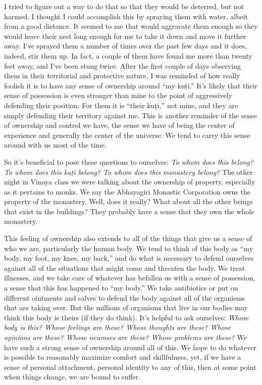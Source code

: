 I tried to figure out a way to do that so that they would be deterred, 
but not harmed. I thought I could accomplish this by spraying them with 
water, albeit from a good distance. It seemed to me that would 
aggravate them enough so they would leave their nest long enough for me 
to take it down and move it further away. I've sprayed them a number of 
times over the past few days and it does, indeed, stir them up. In 
fact, a couple of them have found me more than twenty feet away, and 
I've been stung twice. After the first couple of days observing them in 
their territorial and protective nature, I was reminded of how really 
foolish it is to have any sense of ownership around ``my kuṭi.'' It's 
likely that their sense of possession is even stronger than mine to the 
point of aggressively defending their position. For them it is ``their 
kuṭi,'' not mine, and they are simply defending their territory 
against me. This is another reminder of the sense of ownership and 
control we have, the sense we have of being the center of experience 
and generally the center of the universe. We tend to carry this sense 
around with us most of the time.

So it's beneficial to pose these questions to ourselves: \emph{To whom 
does this belong? To whom does this kuṭi belong? To whom does this 
monastery belong?} The other night in Vinaya class we were talking 
about the ownership of property, especially as it pertains to monks. We 
say the Abhayagiri Monastic Corporation owns the property of the 
monastery. Well, does it really? What about all the other beings that 
exist in the buildings? They probably have a sense that they own the 
whole monastery.

This feeling of ownership also extends to all of the things that give 
us a sense of who we are, particularly the human body. We tend to think 
of this body as ``my body, my foot, my knee, my back,'' and do what is 
necessary to defend ourselves against all of the situations that might 
come and threaten the body. We treat illnesses, and we take care of 
whatever has befallen us with a sense of possession, a sense that this 
has happened to ``my body.'' We take antibiotics or put on different 
ointments and salves to defend the body against all of the organisms 
that are taking over. But the millions of organisms that live in our 
bodies may think this body is theirs (if they do think). It's helpful 
to ask ourselves: \emph{Whose body is this? Whose feelings are these? 
Whose thoughts are these? Whose opinions are these? Whose neuroses are 
these? Whose problems are these?} We have such a strong sense of 
ownership around all of this. We hope to do whatever is possible to 
reasonably maximize comfort and skillfulness, yet, if we have a sense 
of personal attachment, personal identity to any of this, then at some 
point when things change, we are bound to suffer.

